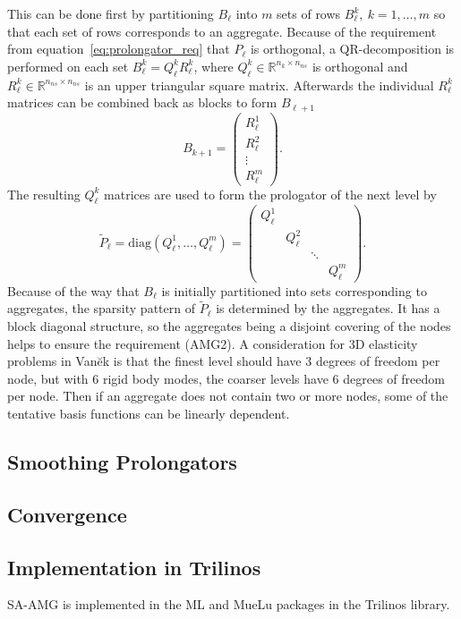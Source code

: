This can be done first by partitioning $B_\ell$ into $m$ sets of rows $B_\ell^k,\ k = 1, \ldots, m$ so that each set of rows corresponds to an aggregate. Because of the requirement from equation~\ref{eq:prolongator_req} that $P_\ell$ is orthogonal, a QR-decomposition is performed on each set $B_\ell^{k} = Q_\ell^k R_\ell^k$, where $Q_\ell^k \in \mathbb{R}^{n_k \times n_{ns}}$ is orthogonal and $R_\ell^k \in \mathbb{R}^{n_{ns} \times n_{ns}}$ is an upper triangular square matrix. Afterwards the individual $R_\ell^k$ matrices can be combined back as blocks to form $B_{\ell+1}$
\begin{equation}
	B_{k+1} =
	\begin{pmatrix}
		R_\ell^1 \\
		R_\ell^2 \\
		\vdots \\ 
		R_\ell^m
	\end{pmatrix}.
\end{equation}
The resulting $Q_\ell^k$ matrices are used to form the prologator of the next level by
\begin{equation}
	\tilde{P}_\ell = \text{diag}\left(Q_\ell^1, \ldots, Q_\ell^m\right) =
	\begin{pmatrix}
		Q_\ell^1 &          &        & \\
		         & Q_\ell^2 &        & \\
				 &          & \ddots & \\
				 &          &        & Q_\ell^m
	\end{pmatrix}.
\end{equation}
Because of the way that $B_\ell$ is initially partitioned into sets corresponding to aggregates, the sparsity pattern of $\tilde{P}_\ell$ is determined by the aggregates. It has a block diagonal structure, so the aggregates being a disjoint covering of the nodes helps to ensure the requirement (AMG2). A consideration for 3D elasticity problems in Van\u{e}k is that the finest level should have 3 degrees of freedom per node, but with 6 rigid body modes, the coarser levels have 6 degrees of freedom per node. Then if an aggregate does not contain two or more nodes, some of the tentative basis functions can be linearly dependent.

\subsection{Smoothing Prolongators}

\subsection{Convergence}

\subsection{Implementation in Trilinos}
SA-AMG is implemented in the ML and MueLu packages in the Trilinos library.
